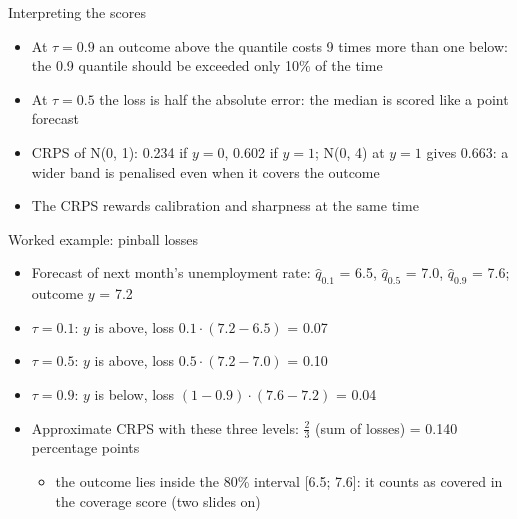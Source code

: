 \begin{frame}{Interpreting the scores}
\itemsize{\small}
\begin{itemize}
    \item At $\tau = 0.9$ an outcome above the quantile costs 9 times more than one below: the 0.9 quantile should be exceeded only 10\% of the time
    \item At $\tau = 0.5$ the loss is half the absolute error: the median is scored like a point forecast
    \item CRPS of N(0, 1): 0.234 if $y = 0$, 0.602 if $y = 1$; N(0, 4) at $y = 1$ gives 0.663: a wider band is penalised even when it covers the outcome
    \item The CRPS rewards calibration and sharpness at the same time
\end{itemize}
\end{frame}

\begin{frame}{Worked example: pinball losses}
\itemsize{\small}
\begin{itemize}
    \item Forecast of next month's unemployment rate: $\hat q_{0.1}$ = 6.5, $\hat q_{0.5}$ = 7.0, $\hat q_{0.9}$ = 7.6; outcome $y$ = 7.2
    \item $\tau = 0.1$: $y$ is above, loss $0.1 \cdot (7.2 - 6.5)$ = 0.07
    \item $\tau = 0.5$: $y$ is above, loss $0.5 \cdot (7.2 - 7.0)$ = 0.10
    \item $\tau = 0.9$: $y$ is below, loss $(1 - 0.9) \cdot (7.6 - 7.2)$ = 0.04
    \item Approximate CRPS with these three levels: $\frac{2}{3}$ (sum of losses) = 0.140 percentage points
    \begin{itemize}
        \item the outcome lies inside the 80\% interval [6.5; 7.6]: it counts as covered in the coverage score (two slides on)
    \end{itemize}
\end{itemize}
\end{frame}

